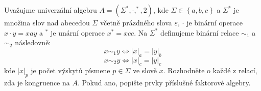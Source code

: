 Uvažujme univerzální algebru $A=\left ( \Sigma^{*},\cdot ,^{*},2 \right )$, kde
$\Sigma \in \left \{ a,b,c \right \}$ a $\Sigma^{*}$ je množina slov nad
abecedou $\Sigma$ včetně prázdného slova $\varepsilon$, $\cdot$ je binární
operace $x \cdot y=xay$ a $^{*}$ je unární operace $x^{*}=xcc$. Na $\Sigma^{*}$
definujeme binární relace $\sim_{1}$ a $\sim_{2}$ následovně:
$$x \sim_{1} y \Leftrightarrow \left | x \right |_{a}=\left | y \right |_{b}$$
$$x \sim_{2} y \Leftrightarrow \left | x \right |_{c}=\left | y \right |_{c}$$
kde $\left | x \right |_{p}$ je počet výskytů písmene $p \in \Sigma$ ve slově
$x$. Rozhodněte o každé z relací, zda je kongruence na $A$. Pokud ano, popište
prvky příslušné faktorové algebry.
